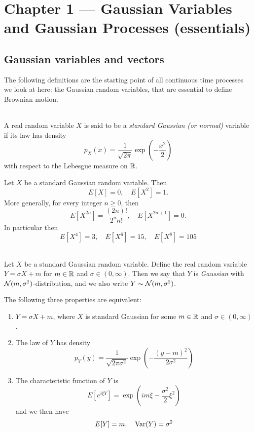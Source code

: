 \section{Chapter 1 --- Gaussian Variables and Gaussian Processes (essentials)}

\subsection{Gaussian variables and vectors}
The following definitions are the starting point of all continuous time processes we look at here: the Gaussian random variables, that are essential to define Brownian motion.
\begin{definition} \label{chap1.1:definition-standard_gaussian_variable}
 \\
A real random variable $X$ is said to be a \textit{standard Gaussian (or normal)} variable if its law has density
$$p_X(x)=\frac{1}{\sqrt{2\pi}}\exp{\left(-\frac{x^2}{2}\right)}$$
with respect to the Lebesgue measure on $\mathbb{R}$.
\end{definition}

\begin{proposition}\label{chap1.1:proposition-moments_of_standard_Gaussian_variables}
Let $X$ be a standard Gaussian random variable. Then 
$$E[X]=0, \quad E[X^2]=1.$$
More generally, for every integer $n \geq 0$, then
\begin{equation}\label{chap1.1:equation-moments_of_standard_Gaussian_random_variables}
E[X^{2n}]=\frac{(2n)!}{2^n n!}, \quad E[X^{2n+1}]=0.
\end{equation}
In particular then 
$$E[X^4]=3, \quad E[X^6]=15, \quad E[X^8]=105$$
\end{proposition}

\begin{proposition} \label{chap1.1:proposition-properties_of_Gaussian_variables}
 \\
Let $X$ be a standard Gaussian random variable. Define the real random variable $Y= \sigma X + m$ for $m \in \mathbb{R}$ and $\sigma \in (0,\infty)$. Then we say that $Y$ is \textit{Gaussian} with $\mathcal{N}(m,\sigma^2)$-distribution, and we also write $Y \sim \mathcal{N}(m,\sigma^2)$. \par

The following three properties are equivalent:
\begin{enumerate}
    \item $Y = \sigma X + m$, where $X$ is standard Gaussian for some $m \in \mathbb{R}$ and $\sigma \in (0,\infty)$.
    \item The law of $Y$ has density
    $$p_Y(y)=\frac{1}{\sqrt{2\pi\sigma^2}}\exp{\left(-\frac{(y-m)^2}{2\sigma^2}\right)}$$
    \item The characteristic function of $Y$ is
    $$E[e^{i\xi Y}]=\exp{\left(im\xi - \frac{\sigma^2}{2}\xi^2 \right)}$$ 
    and we then have 
    $$E[Y]=m, \quad \operatorname{Var}(Y)=\sigma^2$$
\end{enumerate}
\end{proposition}

